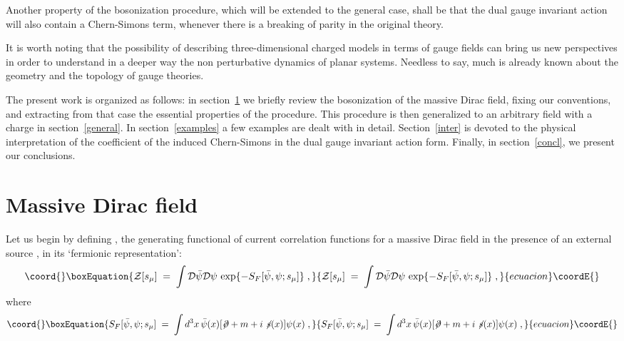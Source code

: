 \documentclass[a4paper,12pt]{article}
\begin{document}
Another property of the bosonization procedure, which will be extended
to the general case, shall be that the dual gauge invariant action
will also contain a Chern-Simons term, whenever there is a breaking of
parity in the original theory.

\noindent It is worth noting  that the possibility of describing
three-dimensional \coordHE{} charged models in terms of gauge fields can
bring us new perspectives in order to understand in a deeper way the
non perturbative dynamics of planar systems. Needless to say, much is
already known about the geometry and the topology of gauge theories.


The present work is organized as follows: in section~\ref{dirac} we
briefly review the bosonization of the massive Dirac field, fixing our
conventions, and extracting from that case the essential properties of
the procedure.  This procedure is then generalized to an arbitrary
field with a \coordHE{} charge in section~\ref{general}.  In
section~\ref{examples} a few examples are dealt with in detail.
Section~\ref{inter} is devoted to the physical interpretation of the
coefficient of the induced Chern-Simons in the dual gauge invariant
action form. Finally, in section~\ref{concl}, we present our
conclusions.

\section{Massive Dirac field}\label{dirac}
Let us begin by defining \coordHE{}, the generating
functional of current correlation functions for a massive Dirac field
in the presence of an external source \coordHE{}, in its
`fermionic representation':
\begin{equation}\coord{}\boxEquation{
  \label{eq:defzf}
  {\mathcal Z}[s_\mu] \;=\; \int {\mathcal D}{\bar\psi} {\mathcal
    D}\psi \, \exp\{- S_F[{\bar\psi},\psi; s_\mu]\} \;,
}{
  {\mathcal Z}[s_\mu] \;=\; \int {\mathcal D}{\bar\psi} {\mathcal
    D}\psi \, \exp\{- S_F[{\bar\psi},\psi; s_\mu]\} \;,
}{ecuacion}\coordE{}\end{equation}
where
\begin{equation}\coord{}\boxEquation{
S_F[{\bar\psi},\psi; s_\mu] \;=\;\int d^3x \, {\bar\psi}(x)[\not\!\partial + m +
    i \not \! s (x)] \psi(x) \;,
}{
S_F[{\bar\psi},\psi; s_\mu] \;=\;\int d^3x \, {\bar\psi}(x)[\not\!\partial + m +
    i \not \! s (x)] \psi(x) \;,
}{ecuacion}\coordE{}\end{equation}
\end{document}
